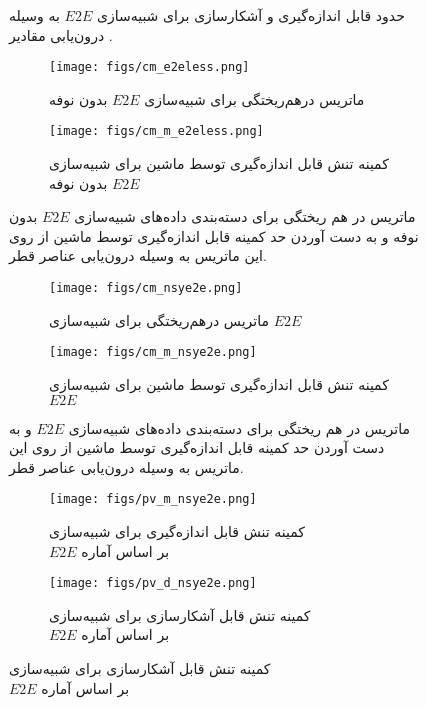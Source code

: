 \begin{itemize}
\begin{figure}[H]
		\caption{حدود قابل اندازه‌گیری و آشکارسازی برای شبیه‌سازی 
			$E2E$
			به وسیله درون‌یابی مقادیر 
			.}
		\label{fig:act_nsyE2E}
	\end{figure}
	\begin{figure}[H]
		\centering
		\begin{subfigure}{\textwidth}
			\centering
			\texttt{[image: figs/cm\_e2eless.png]}
			\caption{  ماتریس درهم‌ریختگی برای شبیه‌سازی 
				$E2E$
				بدون نوفه }
		\end{subfigure}%
		
		\begin{subfigure}{0.5\linewidth}
			\centering
			\texttt{[image: figs/cm\_m\_e2eless.png]}
			\caption{  کمینه تنش قابل اندازه‌گیری توسط ماشین برای شبیه‌سازی 
				$E2E$
				بدون نوفه }
		\end{subfigure}
		
		\caption{ماتریس در هم ریختگی برای دسته‌بندی داده‌های شبیه‌سازی
			$E2E$
			بدون نوفه 
			و به دست آوردن حد کمینه قابل اندازه‌گیری توسط ماشین از روی این ماتریس به وسیله درون‌یابی عناصر قطر.}
		\label{fig:E2Eless_pv}
	\end{figure}
	\begin{figure}[H]
		\centering
		\begin{subfigure}{\textwidth}
			\centering
			\texttt{[image: figs/cm\_nsye2e.png]}
			\caption{  ماتریس درهم‌ریختگی برای شبیه‌سازی 
				$E2E$
			}
		\end{subfigure}%
		
		\begin{subfigure}{0.5\linewidth}
			\centering
			\texttt{[image: figs/cm\_m\_nsye2e.png]}
			\caption{  کمینه تنش قابل اندازه‌گیری توسط ماشین برای شبیه‌سازی 
				$E2E$
			}
		\end{subfigure}
		
		\caption{ماتریس در هم ریختگی برای دسته‌بندی داده‌های شبیه‌سازی
			$E2E$
			و به دست آوردن حد کمینه قابل اندازه‌گیری توسط ماشین از روی این ماتریس به وسیله درون‌یابی عناصر قطر.
		}
		\label{fig:nsyE2E_cm}
	\end{figure}
	
	\begin{figure}[H]
		\centering
		\begin{subfigure}{0.5\textwidth}
			\centering
			\texttt{[image: figs/pv\_m\_nsye2e.png]}
			\caption{   کمینه تنش قابل اندازه‌گیری برای شبیه‌سازی 
				\\			$E2E$
				بر اساس آماره
				 }
		\end{subfigure}%
		\begin{subfigure}{0.5\textwidth}
			\centering
			\texttt{[image: figs/pv\_d\_nsye2e.png]}
			\caption{  کمینه تنش قابل آشکارسازی برای شبیه‌سازی 
				\\ 		$E2E$
				بر اساس آماره 
			}
		\end{subfigure}
		

\end{figure}
\end{itemize}
